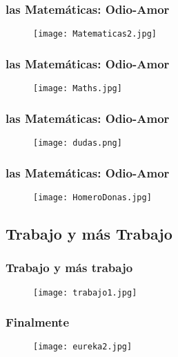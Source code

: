 \documentclass[xcolor=dvipsnames]{beamer}
\begin{document}
\begin{frame}\frametitle{las Matem\'aticas: Odio-Amor}

\begin{figure}[H]
\centering
\texttt{[image: Matematicas2.jpg]}
\end{figure}
\end{frame}


\begin{frame}\frametitle{las Matem\'aticas: Odio-Amor}

\begin{figure}[H]
\centering
\texttt{[image: Maths.jpg]}
\end{figure}
\end{frame}



\begin{frame}\frametitle{las Matem\'aticas: Odio-Amor}

\begin{figure}[H]
\centering
\texttt{[image: dudas.png]}
\end{figure}
\end{frame}



\begin{frame}\frametitle{las Matem\'aticas: Odio-Amor}

\begin{figure}[H]
\centering
\texttt{[image: HomeroDonas.jpg]}
\end{figure}
\end{frame}

\subsection{Trabajo y m\'as Trabajo}


\begin{frame}\frametitle{Trabajo y m\'as trabajo}

\begin{figure}[H]
\centering
\texttt{[image: trabajo1.jpg]}
\end{figure}
\end{frame}


\begin{frame}\frametitle{Finalmente}
\pause
\begin{figure}[H]
\centering
\texttt{[image: eureka2.jpg]}
\end{figure}
\end{frame}
\end{document}

